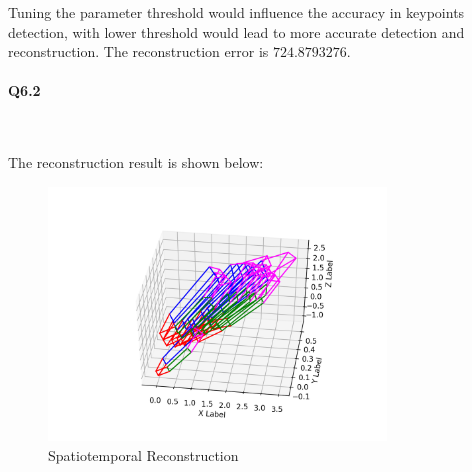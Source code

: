 \documentclass[11pt]{article} \usepackage{fullpage} \usepackage{graphicx} \usepackage{epstopdf} \usepackage{color} \usepackage{psfrag} \usepackage{pdfsync}\usepackage{indentfirst}\usepackage{subfigure}\usepackage{float}\usepackage[section]{placeins}
\begin{document}
Tuning the parameter threshold would influence the accuracy in keypoints detection, with lower threshold would lead to more accurate detection and reconstruction. The reconstruction error is $724.8793276$.

\paragraph{Q6.2}~{}

The reconstruction result is shown below:
\begin{figure}[H]
\centering
\includegraphics[width=0.8\textwidth]{results/q6_2.png}
\caption{Spatiotemporal Reconstruction}
\end{figure}
\end{document}
